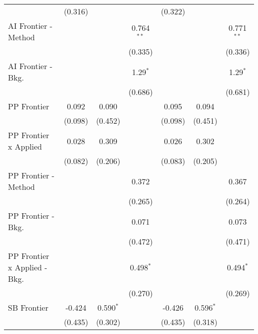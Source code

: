 \begin{tabular}{lcccccc}
                                & (0.316)       &             &              & (0.322)       &             &   \\   
   AI Frontier - Method         &               &             & 0.764$^{**}$ &               &             & 0.771$^{**}$\\   
                                &               &             & (0.335)      &               &             & (0.336)\\   
   AI Frontier - Bkg.           &               &             & 1.29$^{*}$   &               &             & 1.29$^{*}$\\   
                                &               &             & (0.686)      &               &             & (0.681)\\   
   PP Frontier                  & 0.092         & 0.090       &              & 0.095         & 0.094       &   \\   
                                & (0.098)       & (0.452)     &              & (0.098)       & (0.451)     &   \\   
   PP Frontier x Applied        & 0.028         & 0.309       &              & 0.026         & 0.302       &   \\   
                                & (0.082)       & (0.206)     &              & (0.083)       & (0.205)     &   \\   
   PP Frontier - Method         &               &             & 0.372        &               &             & 0.367\\   
                                &               &             & (0.265)      &               &             & (0.264)\\   
   PP Frontier - Bkg.           &               &             & 0.071        &               &             & 0.073\\   
                                &               &             & (0.472)      &               &             & (0.471)\\   
   PP Frontier x Applied - Bkg. &               &             & 0.498$^{*}$  &               &             & 0.494$^{*}$\\   
                                &               &             & (0.270)      &               &             & (0.269)\\   
   SB Frontier                  & -0.424        & 0.590$^{*}$ &              & -0.426        & 0.596$^{*}$ &   \\   
                                & (0.435)       & (0.302)     &              & (0.435)       & (0.318)     &   \\   

\end{tabular}
